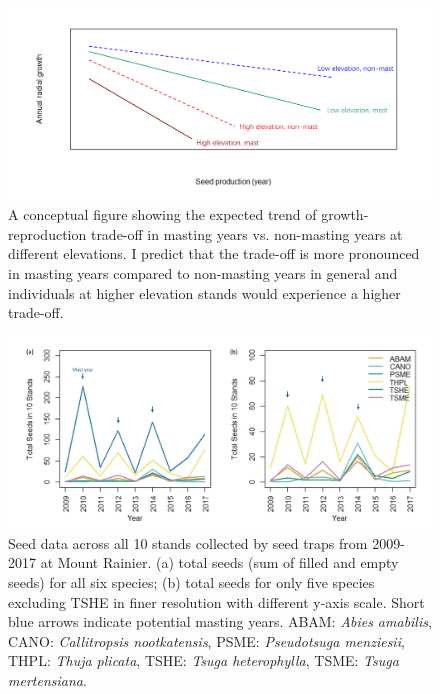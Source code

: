 \documentclass[11pt,letter]{article}
\begin{document}
\begin{figure}[htb]
	\centering
	\includegraphics[width=1\linewidth]{conceptualFigureChap2.png}
	\caption{A conceptual figure showing the expected trend of growth-reproduction trade-off in masting years vs. non-masting years at different elevations. I predict that the trade-off is more pronounced in masting years compared to non-masting years in general and individuals at higher elevation stands would experience a higher trade-off.}
	\label{fig:conceptual2}
\end{figure}
\begin{figure}[htb]
	\centering
	\includegraphics[width=1\linewidth]{Seed1.jpg} %
	\caption{Seed data across all 10 stands collected by seed traps from 2009-2017 at Mount Rainier. (a) total seeds (sum of filled and empty seeds) for all six species; (b) total seeds for only five species excluding TSHE in finer resolution with different y-axis scale. Short blue arrows indicate potential masting years. ABAM: \textit{Abies amabilis}, CANO:  \textit{Callitropsis nootkatensis}, PSME: \textit{Pseudotsuga menziesii}, THPL: \textit{Thuja plicata}, TSHE: \textit{Tsuga heterophylla}, TSME: \textit{Tsuga mertensiana}.}
	\label{fig:seed}
\end{figure}
\end{document}
